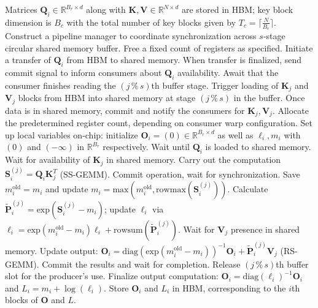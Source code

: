 \begin{algorithm}[H]
    \caption{\small\label{alg:flash3_wgmma_ws_only}\textsc{FlashAttention-3} forward pass \textbf{without} intra-consumer overlapping -- CTA view}
    \begin{algorithmic}[1]
\REQUIRE Matrices $\mathbf{Q}_i \in \mathbb{R}^{B_r \times d}$ along with $\mathbf{K}, \mathbf{V} \in \mathbb{R}^{N \times d}$ are stored in HBM; key block dimension is $B_c$ with the total number of key blocks given by $T_c = \lceil \frac{N}{B_c} \rceil$.
\STATE Construct a pipeline manager to coordinate synchronization across $s$-stage circular shared memory buffer.
\STATE Free a fixed count of registers as specified.
\STATE Initiate a transfer of $\mathbf{Q}_i$ from HBM to shared memory.
\STATE When transfer is finalized, send commit signal to inform consumers about $\mathbf{Q}_i$ availability.
    \STATE Await that the consumer finishes reading the $(j\,\%\,s)$th buffer stage.
    \STATE Trigger loading of $\mathbf{K}_j$ and $\mathbf{V}_j$ blocks from HBM into shared memory at stage $(j\,\%\,s)$ in the buffer.
    \STATE Once data is in shared memory, commit and notify the consumers for $\mathbf{K}_j, \mathbf{V}_j$.
\ENDFOR
\ELSE \STATE Allocate the predetermined register count, depending on consumer warp configuration.
\STATE Set up local variables on-chip: initialize $\mathbf{O}_i = (0) \in \mathbb{R}^{B_r \times d}$ as well as $\ell_i, m_i$ with $(0)$ and $(-\infty)$ in $\mathbb{R}^{B_r}$ respectively.
\STATE Wait until $\mathbf{Q}_i$ is loaded to shared memory.
\STATE Wait for availability of $\mathbf{K}_j$ in shared memory.
\STATE Carry out the computation $\mathbf{S}_i^{(j)} = \mathbf{Q}_i \mathbf{K}_j^T$ (SS-GEMM). Commit operation, wait for synchronization. \label{alg:ws_only_gemm1}
\STATE Save $m_i^{\mathrm{old}} = m_i$ and update $m_i = \mathrm{max}(m_i^{\mathrm{old}}, \mathrm{rowmax}(\mathbf{S}_i^{(j)}))$. \label{code-ws:softmax_start}
\STATE Calculate $\widetilde{\mathbf{P}}_i^{(j)} = \mathrm{exp}(\mathbf{S}_i^{(j)} - m_i)$; update $\ell_i$ via $\ell_i = \mathrm{exp}(m_i^{\mathrm{old}} - m_i) \ell_i + \mathrm{rowsum}(\widetilde{\mathbf{P}}_i^{(j)})$. \label{code-ws:softmax_end}
\STATE Wait for $\mathbf{V}_j$ presence in shared memory.
\STATE Update output: $\mathbf{O}_i = \mathrm{diag}(\mathrm{exp}(m_i^{\mathrm{old}} - m_i))^{-1} \mathbf{O}_i + \widetilde{\mathbf{P}}_i^{(j)} \mathbf{V}_j$ (RS-GEMM). Commit the results and wait for completion. \label{alg:ws_only_gemm2}
\STATE Release $(j\,\%\,s)$th buffer slot for the producer’s use.
\ENDFOR
\STATE Finalize output computation: $\mathbf{O}_i = \mathrm{diag}(\ell_i)^{-1} \mathbf{O}_i$ and $L_i = m_i + \log(\ell_i)$.
\STATE Store $\mathbf{O}_i$ and $L_i$ in HBM, corresponding to the $i$th blocks of $\mathbf{O}$ and $L$.
\ENDIF
\end{algorithmic}
\end{algorithm}

